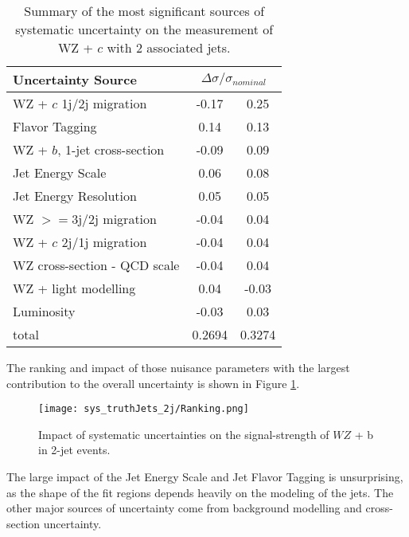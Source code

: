 \begin{table}[H]
  \centering
    \begin{tabular}{l|cc}
        \hline\hline
        Uncertainty Source & \multicolumn{2}{c}{$\Delta \sigma/\sigma_{nominal}$ }  \\
        \hline
        WZ + $c$ 1j/2j migration & -0.17 & 0.25 \\
        Flavor Tagging & 0.14 & 0.13 \\
        WZ + $b$, 1-jet cross-section & -0.09 & 0.09 \\
        Jet Energy Scale & 0.06 & 0.08 \\
        Jet Energy Resolution & 0.05 & 0.05 \\
        WZ $>=$3j/2j migration & -0.04 & 0.04 \\
        WZ + $c$ 2j/1j migration & -0.04 & 0.04 \\
        WZ cross-section - QCD scale & -0.04 & 0.04 \\
        WZ + light modelling & 0.04 & -0.03 \\
        Luminosity & -0.03 & 0.03 \\
        \hline
        total & 0.2694 & 0.3274 \\
        \hline\hline
    \end{tabular}
    \caption{Summary of the most significant sources of systematic uncertainty on the measurement of WZ + $c$ with 2 associated jets.}
    \label{tab:systematics_c2j}
\end{table}

The ranking and impact of those nuisance parameters with the largest contribution to the overall uncertainty is shown in Figure \ref{fig:ranking_2j}.

\begin{figure}[H]
    \centering
    \texttt{[image: sys\_truthJets\_2j/Ranking.png]}
    \caption{Impact of systematic uncertainties on the signal-strength of $WZ$ + b in 2-jet events.}
    \label{fig:ranking_2j}
\end{figure}

The large impact of the Jet Energy Scale and Jet Flavor Tagging is unsurprising, as the shape of the fit regions depends heavily on the modeling of the jets. The other major sources of uncertainty come from background modelling and cross-section uncertainty. %

